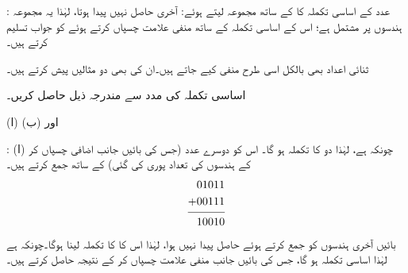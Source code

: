 :\quad 
عدد  کے اساسی تکملہ  کا  کے ساتھ مجموعہ لیتے ہوئے:  آخری حاصل  نہیں پیدا ہوتا، لہٰذا یہ مجموعہ 
  ہندسوں پر مشتمل ہے؛ اس کے اساسی تکملہ  کے ساتھ منفی علامت چسپاں کرتے ہوئے  کو جواب تسلیم کرتے ہیں۔
\begin{center}
\begin{otherlanguage}{english}
\quad\quad
{}\quad\quad
{}\quad\quad
{}
\end{otherlanguage}
\end{center}

ثنائی اعداد بھی بالکل اسی طرح منفی کیے جاتے ہیں۔ان کی بھی دو مثالیں پیش کرتے ہیں۔
	

 اساسی تکملہ کی مدد سے مندرجہ ذیل حاصل کریں۔
 
(ا)  اور (ب) 

:\quad
(ا) چونکہ  ہے، لہٰذا دو کا تکملہ  ہو گا۔ اس کو دوسرے عدد  (جس کی بائیں جانب اضافی  چسپاں کر کے ہندسوں کی تعداد پوری کی گئی) کے ساتھ جمع کرتے ہیں۔
\begin{align*}
\begin{split}
01011&\\
+00111&\\
\noalign{\smallskip}\hline\noalign{\smallskip}
10010&
\end{split}
\end{align*}
بائیں آخری ہندسوں کو جمع کرتے ہوئے حاصل  پیدا نہیں ہوا، لہٰذا اس کا  کا تکملہ لینا ہوگا۔چونکہ  ہے لہٰذا اساسی تکملہ  ہو گا، جس کی بائیں جانب منفی علامت چسپاں کر کے نتیجہ  حاصل کرتے ہیں۔

